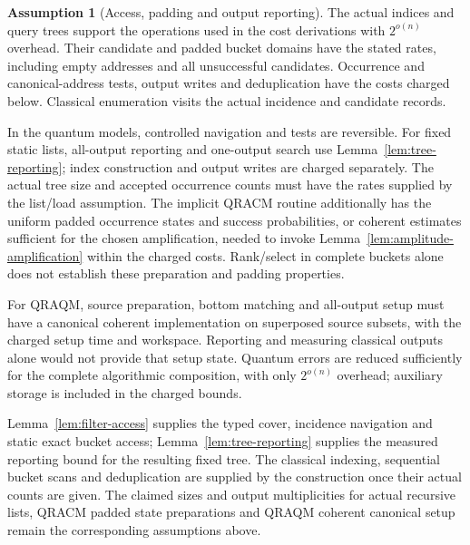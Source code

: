 \documentclass[10pt,a4paper]{article}
\theoremstyle{definition}
\newtheorem{assumption}[theorem]{Assumption}
\begin{document}
\begin{assumption}[Access, padding and output reporting]
\label{ass:access}
The actual indices and query trees support the operations used in the
cost derivations with $2^{o(n)}$ overhead. Their candidate and padded
bucket domains have the stated rates, including empty addresses and
all unsuccessful candidates. Occurrence and canonical-address tests,
output writes and deduplication have the costs charged below.
Classical enumeration visits the actual incidence and candidate records.

In the quantum models, controlled navigation and tests are reversible.
For fixed static lists, all-output reporting and one-output search use
Lemma~\ref{lem:tree-reporting}; index construction and output writes are
charged separately. The actual tree size and accepted occurrence counts
must have the rates supplied by the list/load assumption. The implicit
QRACM routine additionally has the uniform padded occurrence states and
success probabilities, or coherent estimates sufficient for the chosen
amplification, needed to invoke Lemma~\ref{lem:amplitude-amplification}
within the charged costs. Rank/select in complete buckets alone does
not establish these preparation and padding properties.

For QRAQM, source preparation, bottom matching and all-output setup
must have a canonical coherent implementation on superposed source
subsets, with the charged setup time and workspace. Reporting and
measuring classical outputs alone would not provide that setup state.
Quantum errors are reduced sufficiently for the complete algorithmic composition, with only $2^{o(n)}$ overhead;
auxiliary storage is included in the charged bounds.
\end{assumption}
Lemma~\ref{lem:filter-access} supplies the typed cover, incidence
navigation and static exact bucket access; Lemma~\ref{lem:tree-reporting}
supplies the measured reporting bound for the resulting fixed tree.
The classical indexing, sequential bucket scans and deduplication are supplied by the construction once their actual counts are given.
The claimed sizes and output multiplicities for actual recursive lists,
QRACM padded state preparations and QRAQM coherent canonical setup remain
the corresponding assumptions above.
\end{document}
